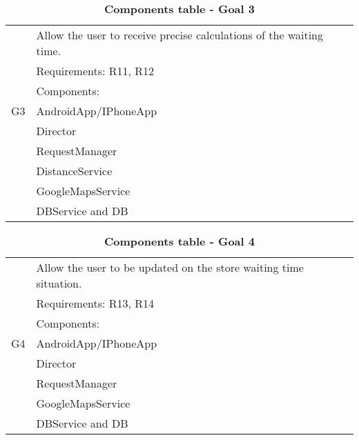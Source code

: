 \begin{table}
\begin{flushleft}
\begin{tabular}{|l|l|}
\hline
\cellcolor[HTML]{EC8D78}& \cellcolor[HTML]{F4D5CE}Allow the user to receive precise calculations of the waiting time.\\
\cline{2-2}
\cellcolor[HTML]{EC8D78}& \cellcolor[HTML]{F4D5CE}Requirements: R11, R12\\
\cline{2-2}
\cellcolor[HTML]{EC8D78}&Components:\\

\cellcolor[HTML]{EC8D78}G3&\quad\quad AndroidApp/IPhoneApp\\

\cellcolor[HTML]{EC8D78}&\quad\quad	Director \\

\cellcolor[HTML]{EC8D78}&\quad\quad	RequestManager \\

\cellcolor[HTML]{EC8D78}&\quad\quad\quad\quad	DistanceService \\

\cellcolor[HTML]{EC8D78}&\quad\quad	GoogleMapsService\\ 

\cellcolor[HTML]{EC8D78}&\quad\quad	DBService and DB \\
\hline
\end{tabular}
\end{flushleft}
\caption{\textbf{Components table - Goal 3}}
\label{tab:comp1}
\end{table}



\begin{table}
\begin{flushleft}
\begin{tabular}{|l|l|}
\hline
\cellcolor[HTML]{EC8D78}& \cellcolor[HTML]{F4D5CE}Allow the user to be updated on the store waiting time situation.\\
\cline{2-2}
\cellcolor[HTML]{EC8D78}& \cellcolor[HTML]{F4D5CE}Requirements: R13, R14\\
\cline{2-2}
\cellcolor[HTML]{EC8D78}&Components:\\

\cellcolor[HTML]{EC8D78}G4&\quad\quad AndroidApp/IPhoneApp\\

\cellcolor[HTML]{EC8D78}&\quad\quad	Director \\

\cellcolor[HTML]{EC8D78}&\quad\quad	RequestManager \\

\cellcolor[HTML]{EC8D78}&\quad\quad	GoogleMapsService \\

\cellcolor[HTML]{EC8D78}&\quad\quad	DBService and DB \\
\hline
\end{tabular}
\end{flushleft}
\caption{\textbf{Components table - Goal 4}}
\label{tab:comp1}
\end{table}




